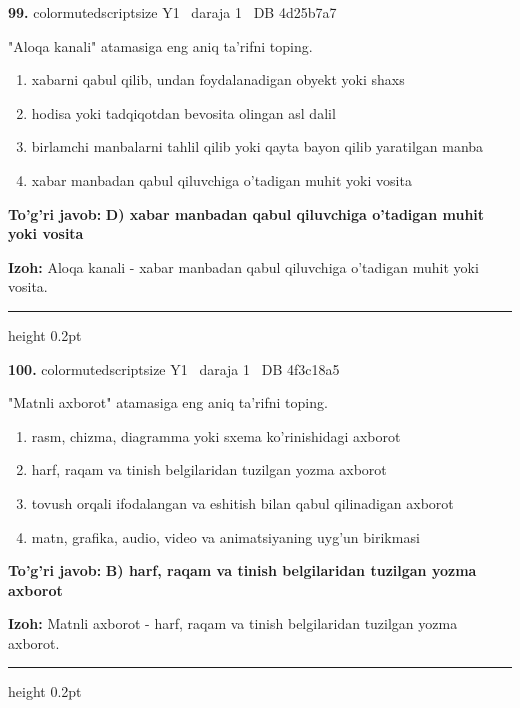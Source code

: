 \documentclass[10pt,a4paper,oneside]{article}
\begin{document}
\noindent\textbf{\color{ink}99.}  {color{muted}scriptsize Y1 \textbullet\ daraja 1 \textbullet\ DB 4d25b7a7}
\par
"Aloqa kanali" atamasiga eng aniq ta'rifni toping.
\begin{enumerate}[label=\Alph*),leftmargin=9mm]
\item xabarni qabul qilib, undan foydalanadigan obyekt yoki shaxs
\item hodisa yoki tadqiqotdan bevosita olingan asl dalil
\item birlamchi manbalarni tahlil qilib yoki qayta bayon qilib yaratilgan manba
\item xabar manbadan qabul qiluvchiga o'tadigan muhit yoki vosita
\end{enumerate}
\begin{tcolorbox}[enhanced,breakable,colback=teal!4,colframe=teal!50!black,boxrule=0.5pt,arc=1.1mm,left=3mm,right=3mm,top=1.7mm,bottom=1.7mm,before skip=2mm,after skip=2mm]
\textbf{\color{teal}To'g'ri javob:} \textbf{D) xabar manbadan qabul qiluvchiga o'tadigan muhit yoki vosita}
\par\smallskip
\textbf{Izoh:} Aloqa kanali - xabar manbadan qabul qiluvchiga o'tadigan muhit yoki vosita.
\end{tcolorbox}
\vspace{2mm}\hrule height 0.2pt \vspace{3mm}

\noindent\textbf{\color{ink}100.}  {color{muted}scriptsize Y1 \textbullet\ daraja 1 \textbullet\ DB 4f3c18a5}
\par
"Matnli axborot" atamasiga eng aniq ta'rifni toping.
\begin{enumerate}[label=\Alph*),leftmargin=9mm]
\item rasm, chizma, diagramma yoki sxema ko'rinishidagi axborot
\item harf, raqam va tinish belgilaridan tuzilgan yozma axborot
\item tovush orqali ifodalangan va eshitish bilan qabul qilinadigan axborot
\item matn, grafika, audio, video va animatsiyaning uyg'un birikmasi
\end{enumerate}
\begin{tcolorbox}[enhanced,breakable,colback=teal!4,colframe=teal!50!black,boxrule=0.5pt,arc=1.1mm,left=3mm,right=3mm,top=1.7mm,bottom=1.7mm,before skip=2mm,after skip=2mm]
\textbf{\color{teal}To'g'ri javob:} \textbf{B) harf, raqam va tinish belgilaridan tuzilgan yozma axborot}
\par\smallskip
\textbf{Izoh:} Matnli axborot - harf, raqam va tinish belgilaridan tuzilgan yozma axborot.
\end{tcolorbox}
\vspace{2mm}\hrule height 0.2pt \vspace{3mm}
\end{document}
